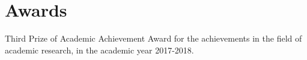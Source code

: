 \documentclass[master]{thesis-uestc}
\begin{document}


\printglossary


\section*{Awards}
Third Prize of Academic Achievement Award for the achievements in the field of academic research, in the academic year 2017-2018.





\end{document}
